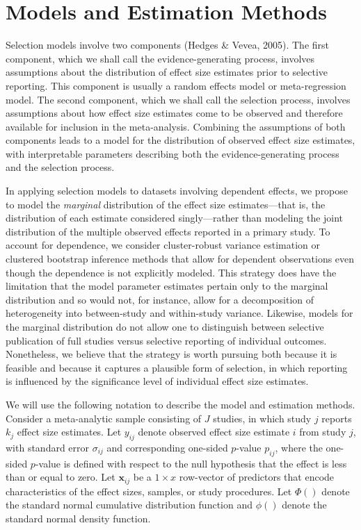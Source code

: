 \documentclass[
  man, donotrepeattitle,floatsintext]{apa7}
\begin{document}
\section{Models and Estimation Methods}\label{model-and-estimation}

Selection models involve two components (Hedges \& Vevea, 2005). The first component, which we shall call the evidence-generating process, involves assumptions about the distribution of effect size estimates prior to selective reporting.
This component is usually a random effects model or meta-regression model.
The second component, which we shall call the selection process, involves assumptions about how effect size estimates come to be observed and therefore available for inclusion in the meta-analysis.
Combining the assumptions of both components leads to a model for the distribution of observed effect size estimates, with interpretable parameters describing both the evidence-generating process and the selection process.

In applying selection models to datasets involving dependent effects, we propose to model the \emph{marginal} distribution of the effect size estimates---that is, the distribution of each estimate considered singly---rather than modeling the joint distribution of the multiple observed effects reported in a primary study.
To account for dependence, we consider cluster-robust variance estimation or clustered bootstrap inference methods that allow for dependent observations even though the dependence is not explicitly modeled.
This strategy does have the limitation that the model parameter estimates pertain only to the marginal distribution and so would not, for instance, allow for a decomposition of heterogeneity into between-study and within-study variance.
Likewise, models for the marginal distribution do not allow one to distinguish between selective publication of full studies versus selective reporting of individual outcomes.
Nonetheless, we believe that the strategy is worth pursuing both because it is feasible and because it captures a plausible form of selection, in which reporting is influenced by the significance level of individual effect size estimates.

We will use the following notation to describe the model and estimation methods. Consider a meta-analytic sample consisting of \(J\) studies, in which study \(j\) reports \(k_j\) effect size estimates. Let \(y_{ij}\) denote observed effect size estimate \(i\) from study \(j\), with standard error \(\sigma_{ij}\) and corresponding one-sided \(p\)-value \(p_{ij}\), where the one-sided \(p\)-value is defined with respect to the null hypothesis that the effect is less than or equal to zero. Let \(\mathbf{x}_{ij}\) be a \(1 \times x\) row-vector of predictors that encode characteristics of the effect sizes, samples, or study procedures. Let \(\Phi()\) denote the standard normal cumulative distribution function and \(\phi()\) denote the standard normal density function.
\end{document}
